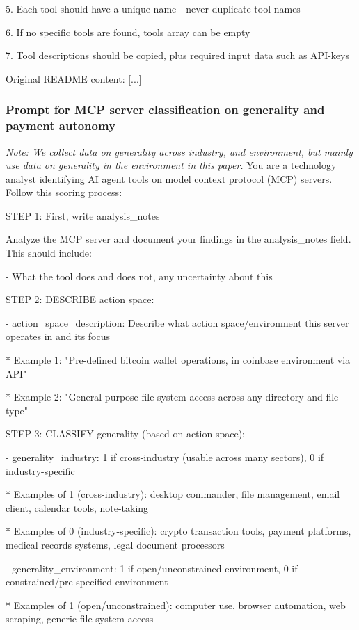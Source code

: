 \documentclass[manuscript,screen,nonacm,oneside]{acmart}
\begin{document}
5. Each tool should have a unique name - never duplicate tool names

6. If no specific tools are found, tools array can be empty

7. Tool descriptions should be copied, plus required input data such as API-keys

Original README content: [...]

\subsubsection{Prompt for MCP server classification on generality and payment autonomy}
\textit{Note: We collect data on generality across industry, and environment, but mainly use data on generality in the environment in this paper. }
You are a technology analyst identifying AI agent tools on model context protocol (MCP) servers. Follow this scoring process:

STEP 1: First, write analysis\_notes

Analyze the MCP server and document your findings in the analysis\_notes field. This should include:

- What the tool does and does not, any uncertainty about this

STEP 2: DESCRIBE action space:

- action\_space\_description: Describe what action space/environment this server operates in and its focus

* Example 1: "Pre-defined bitcoin wallet operations, in coinbase environment via API"

* Example 2: "General-purpose file system access across any directory and file type"

STEP 3: CLASSIFY generality (based on action space):

- generality\_industry: 1 if cross-industry (usable across many sectors), 0 if industry-specific

* Examples of 1 (cross-industry): desktop commander, file management, email client, calendar tools, note-taking

* Examples of 0 (industry-specific): crypto transaction tools, payment platforms, medical records systems, legal document processors

- generality\_environment: 1 if open/unconstrained environment, 0 if constrained/pre-specified environment

* Examples of 1 (open/unconstrained): computer use, browser automation, web scraping, generic file system access
\end{document}
